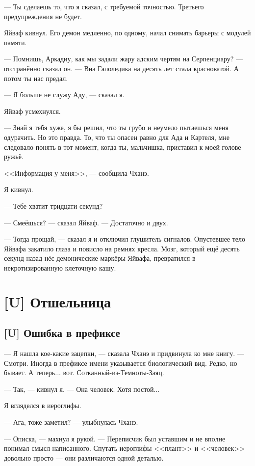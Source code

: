--- Ты сделаешь то, что я сказал, с требуемой точностью.
Третьего предупреждения не будет.

Яйваф кивнул.
Его демон медленно, по одному, начал снимать барьеры с модулей памяти.

--- Помнишь, Аркадиу, как мы задали жару адским чертям на Серпенциару? --- отстранённо сказал он.
--- Виа Галоледика на десять лет стала красноватой.
А потом ты нас предал.

--- Я больше не служу Аду, --- сказал я.

Яйваф усмехнулся.

--- Знай я тебя хуже, я бы решил, что ты грубо и неумело пытаешься меня одурачить.
Но это правда.
То, что ты опасен равно для Ада и Картеля, мне следовало понять в тот момент, когда ты, мальчишка, приставил к моей голове ружьё.

<<Информация у меня>>, --- сообщила Чханэ.

Я кивнул.

--- Тебе хватит тридцати секунд?

--- Смеёшься? --- сказал Яйваф.
--- Достаточно и двух.

--- Тогда прощай, --- сказал я и отключил глушитель сигналов.
Опустевшее тело Яйвафа закатило глаза и повисло на ремнях кресла.
Мозг, который ещё десять секунд назад нёс демонические маркёры Яйвафа, превратился в некротизированную клеточную кашу.

\chapter{[U] Отшельница}

\section{[U] Ошибка в префиксе}

\textspace

--- Я нашла кое-какие зацепки, --- сказала Чханэ и придвинула ко мне книгу.
--- Смотри.
Иногда в префиксе имени указывается биологический вид.
Редко, но бывает.
А теперь... вот.
Сотканный-из-Темноты-Заяц.

--- Так, --- кивнул я.
--- Она человек.
Хотя постой...

Я вгляделся в иероглифы.

--- Ага, тоже заметил? --- улыбнулась Чханэ.

--- Описка, --- махнул я рукой.
--- Переписчик был уставшим и не вполне понимал смысл написанного.
Спутать иероглифы <<плант>> и <<человек>> довольно просто --- они различаются одной деталью.

